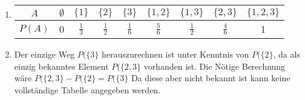 \begin{enumerate}
	\item 
	\begin{tabular}{|c|c|c|c|c|c|c|c|c|}
		\hline
		$ A $ & $\emptyset$ &$ \{1\} $ &$ \{2\} $&$ \{3\} $&$ \{1,2\} $&$ \{1,3\} $&$ \{2,3\} $&$ \{1,2,3\} $ \\
		\hline
		$ P(A)$ & 0 & $\frac{1}{3} $& $\frac{1}{2}$& $ \frac{1}{6}$& $\frac{5}{6} $&$ \frac{1}{2} $&$ \frac{4}{6} $&1\\
		\hline
	\end{tabular}

	\item Der einzige Weg $P(\{3\}$ herauszurechnen ist  unter Kenntnis von $P(\{2\}$, da als einzig bekanntes Element $P(\{2,3\}$ vorhanden ist. Die Nötige Berechnung wäre $P(\{2,3\}- P(\{2\}= P(\{3\} $
	Da diese aber nicht bekannt ist kann keine vollständige Tabelle angegeben werden.
\end{enumerate}

